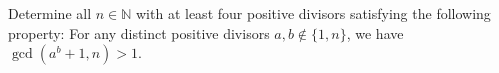  Determine all $n \in \mathbb{N}$ with at least four positive divisors satisfying the following property:
 For any distinct positive divisors $a,b \notin \{1, n\} $, we have $\gcd(a^b+1,n) > 1$.
